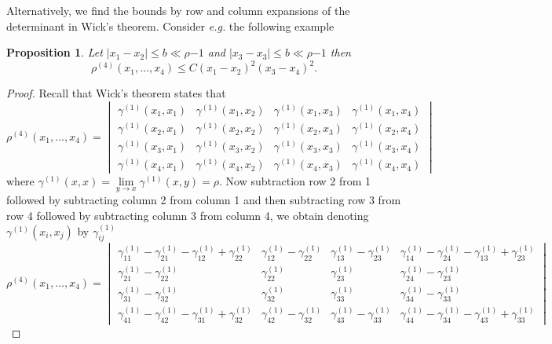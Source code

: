 \documentclass[a4paper,11pt]{article}
\newcommand{\abs}[1]{\left\lvert #1 \right\rvert}
\newcommand{\eg}{\emph{e.g.} }
\newtheorem{proposition}{Proposition}
\numberwithin{equation}{section}
\begin{document}
		Alternatively, we find the bounds by row and column expansions of the determinant in Wick's theorem. Consider \eg the following example\begin{proposition}
			Let $ \abs{x_1-x_2}\leq b\ll \rho{-1} $ and $ \abs{x_3-x_3}\leq b\ll \rho{-1} $ then \begin{equation}
			\rho^{(4)}(x_1,...,x_4)\leq C(x_1-x_2)^2(x_3-x_4)^2.
			\end{equation}
		\end{proposition}
		\begin{proof}
			Recall that Wick's theorem states that \begin{equation}
			\rho^{(4)}(x_1,...,x_4)=\begin{vmatrix}
			\gamma^{(1)}(x_1,x_1)&\gamma^{(1)}(x_1,x_2)&\gamma^{(1)}(x_1,x_3)&\gamma^{(1)}(x_1,x_4)\\
			\gamma^{(1)}(x_2,x_1)&\gamma^{(1)}(x_2,x_2)&\gamma^{(1)}(x_2,x_3)&\gamma^{(1)}(x_2,x_4)\\
			\gamma^{(1)}(x_3,x_1)&\gamma^{(1)}(x_3,x_2)&\gamma^{(1)}(x_3,x_3)&\gamma^{(1)}(x_3,x_4)\\
			\gamma^{(1)}(x_4,x_1)&\gamma^{(1)}(x_4,x_2)&\gamma^{(1)}(x_4,x_3)&\gamma^{(1)}(x_4,x_4)
			\end{vmatrix}
			\end{equation}
			where $ \gamma^{(1)}(x,x)=\lim\limits_{y\to x}\gamma^{(1)}(x,y)=\rho $. Now subtraction row 2 from 1 followed by subtracting column 2 from column 1 and then subtracting row 3 from row 4 followed by subtracting column 3 from column 4, we obtain denoting $ \gamma^{(1)}(x_i,x_j) $ by $ \gamma^{(1)}_{ij} $
			\begin{equation}
			\rho^{(4)}(x_1,...,x_4)=\begin{vmatrix}
			\gamma^{(1)}_{11}-\gamma^{(1)}_{21}-\gamma^{(1)}_{12}+\gamma^{(1)}_{22}&\gamma^{(1)}_{12}-\gamma^{(1)}_{22}&\gamma^{(1)}_{13}-\gamma^{(1)}_{23}&\gamma^{(1)}_{14}-\gamma^{(1)}_{24}-\gamma^{(1)}_{13}+\gamma^{(1)}_{23}\\
			\gamma^{(1)}_{21}-\gamma^{(1)}_{22}&\gamma^{(1)}_{22}&\gamma^{(1)}_{23}&\gamma^{(1)}_{24}-\gamma^{(1)}_{23}\\
			\gamma^{(1)}_{31}-\gamma^{(1)}_{32}&\gamma^{(1)}_{32}&\gamma^{(1)}_{33}&\gamma^{(1)}_{34}-\gamma^{(1)}_{33}\\
			\gamma^{(1)}_{41}-\gamma^{(1)}_{42}-\gamma^{(1)}_{31}+\gamma^{(1)}_{32}&\gamma^{(1)}_{42}-\gamma^{(1)}_{32}&\gamma^{(1)}_{43}-\gamma^{(1)}_{33}&\gamma^{(1)}_{44}-\gamma^{(1)}_{34}-\gamma^{(1)}_{43}+\gamma^{(1)}_{33}
			\end{vmatrix}

\end{equation}
\end{proof}
\end{document}
